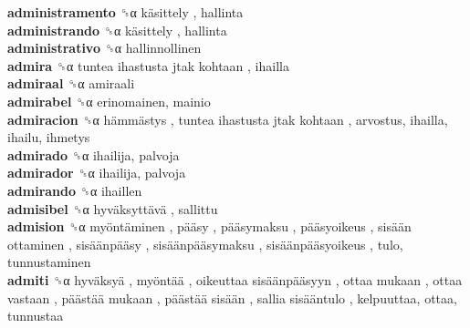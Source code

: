 \textbf{administramento} ␝α   käsittely , hallinta  \\
\textbf{administrando} ␝α   käsittely , hallinta  \\
\textbf{administrativo} ␝α  hallinnollinen  \\
\textbf{admira} ␝α   tuntea ihastusta jtak kohtaan , ihailla  \\
\textbf{admiraal} ␝α  amiraali  \\
\textbf{admirabel} ␝α  erinomainen, mainio  \\
\textbf{admiracion} ␝α   hämmästys ,  tuntea ihastusta jtak kohtaan , arvostus, ihailla, ihailu, ihmetys  \\
\textbf{admirado} ␝α  ihailija, palvoja  \\
\textbf{admirador} ␝α  ihailija, palvoja  \\
\textbf{admirando} ␝α  ihaillen  \\
\textbf{admisibel} ␝α   hyväksyttävä , sallittu  \\
\textbf{admision} ␝α   myöntäminen ,  pääsy ,  pääsymaksu ,  pääsyoikeus ,  sisään ottaminen ,  sisäänpääsy ,  sisäänpääsymaksu ,  sisäänpääsyoikeus , tulo, tunnustaminen  \\
\textbf{admiti} ␝α   hyväksyä ,  myöntää ,  oikeuttaa sisäänpääsyyn ,  ottaa mukaan ,  ottaa vastaan ,  päästää mukaan ,  päästää sisään ,  sallia sisääntulo , kelpuuttaa, ottaa, tunnustaa  \\
